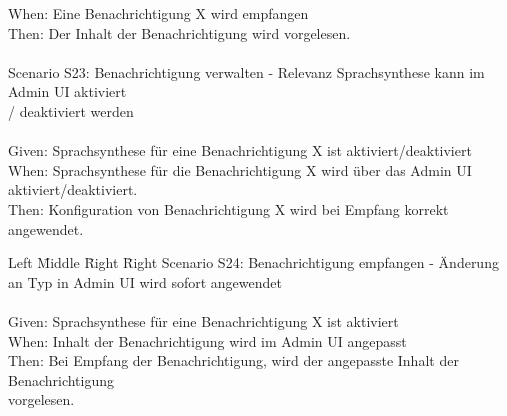 \begin{tabbing}
    When:   \> \> \> Eine Benachrichtigung X wird empfangen \\
    Then:   \> \> \> Der Inhalt der Benachrichtigung wird vorgelesen. \\
    \\
    Scenario S23: \> \> \> Benachrichtigung verwalten - Relevanz Sprachsynthese kann im Admin UI aktiviert \\
    \> \> \>  / deaktiviert werden \\ \\
    Given:  \> \> \> Sprachsynthese für eine Benachrichtigung X ist aktiviert/deaktiviert \\
    When:   \> \> \> Sprachsynthese für die Benachrichtigung X wird über das Admin UI aktiviert/deaktiviert. \\
    Then:   \> \> \> Konfiguration von Benachrichtigung X wird bei Empfang korrekt angewendet. \\
    \clearpage
\end{tabbing}
\begin{tabbing}
    Left \= Middle \= Right \= Right \kill
    Scenario S24: \> \> \> Benachrichtigung empfangen - Änderung an Typ in Admin UI wird sofort angewendet \\ \\
    Given:  \> \> \> Sprachsynthese für eine Benachrichtigung X ist aktiviert \\
    When:   \> \> \> Inhalt der Benachrichtigung wird im Admin UI angepasst\\
    Then:   \> \> \> Bei Empfang der Benachrichtigung, wird der angepasste Inhalt der Benachrichtigung  \\
    \> \> \> vorgelesen.\\
\end{tabbing}
